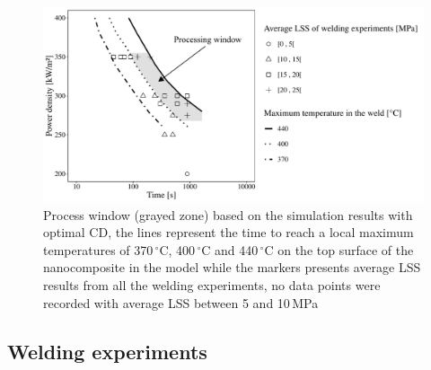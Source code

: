 \documentclass[review,times,sagev,doublespace]{sagej}
\begin{document}
\begin{figure}[ht]
	\center
	\includegraphics[width=\textwidth]{Fig7}
	\caption{Process window (grayed zone) based on the simulation results with optimal {CD}, the lines represent the time to reach a local maximum temperatures of 370\,$^{\circ}$C, 400\,$^{\circ}$C and 440\,$^{\circ}$C on the top surface of the nanocomposite in the model while the markers presents {average LSS} results from all the welding experiments{, no data points were recorded with average LSS between 5 and 10\,MPa} \cite{Brassard2019b}}
	\label{fig:Fig7}
\end{figure} 

\FloatBarrier
	\subsection{Welding experiments}
\end{document}
